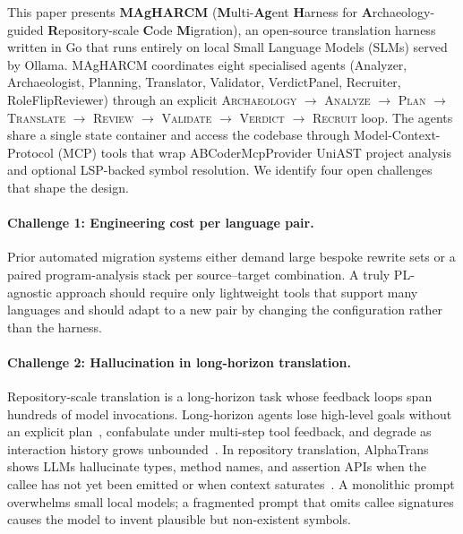 This paper presents \textbf{MAgHARCM} (\textbf{M}ulti-\textbf{Ag}ent
\textbf{H}arness for \textbf{A}rchaeology-guided \textbf{R}epository-scale
\textbf{C}ode \textbf{M}igration), an open-source translation harness
written in Go that runs entirely on local Small Language Models (SLMs)
served by Ollama. MAgHARCM coordinates eight specialised agents
(Analyzer, Archaeologist, Planning, Translator, Validator, VerdictPanel,
Recruiter, RoleFlipReviewer) through an explicit
\textsc{Archaeology} $\to$ \textsc{Analyze} $\to$ \textsc{Plan} $\to$
\textsc{Translate} $\to$ \textsc{Review} $\to$ \textsc{Validate} $\to$
\textsc{Verdict} $\to$ \textsc{Recruit} loop. The agents share a single
state container and access the codebase through Model-Context-Protocol
(MCP) tools that wrap ABCoderMcpProvider UniAST project analysis and
optional LSP-backed symbol resolution. We identify four open challenges
that shape the design.

\paragraph{Challenge 1: Engineering cost per language pair.}
Prior automated migration systems either demand large bespoke rewrite
sets or a paired program-analysis stack per source--target combination.
A truly PL-agnostic approach should require only lightweight tools that
support many languages and should adapt to a new pair by changing the
configuration rather than the harness.

\paragraph{Challenge 2: Hallucination in long-horizon translation.}
Repository-scale translation is a long-horizon task whose feedback loops
span hundreds of model invocations. Long-horizon agents lose high-level
goals without an explicit plan~\cite{p53_context_folding}, confabulate
under multi-step tool feedback, and degrade as interaction history grows
unbounded~\cite{p06_long_horizon}. In repository translation, AlphaTrans
shows LLMs hallucinate types, method names, and assertion APIs when the
callee has not yet been emitted or when context saturates~\cite{yang2024alphatrans}.
A monolithic prompt overwhelms small local models; a fragmented prompt
that omits callee signatures causes the model to invent plausible but
non-existent symbols.

